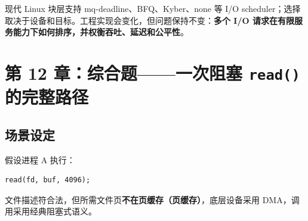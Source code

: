 \documentclass[UTF8,fontset=fandol,11pt,a4paper]{ctexart}
\newcommand{\kw}[1]{\textbf{#1}}
\newcommand{\code}[1]{\texttt{#1}}
\begin{document}
\begin{eng}
现代 Linux 块层支持 mq-deadline、BFQ、Kyber、none 等 I/O scheduler；选择取决于设备和目标。工程实现会变化，但问题保持不变：\kw{多个 I/O 请求在有限服务能力下如何排序，并权衡吞吐、延迟和公平性}。
\end{eng}

\section{第 12 章：综合题——一次阻塞 \texorpdfstring{\code{read()}}{read()} 的完整路径}

\subsection{场景设定}
假设进程 A 执行：
\begin{lstlisting}
read(fd, buf, 4096);
\end{lstlisting}
文件描述符合法，但所需文件页\kw{不在页缓存（页缓存）}，底层设备采用 DMA，调用采用经典阻塞式语义。
\end{document}
